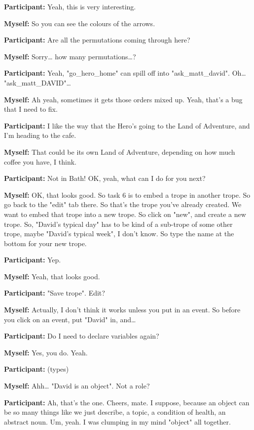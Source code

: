 \documentclass[11pt]{report}
\begin{document}
\begin{linenumbers}
\textbf{Participant:} Yeah, this is very interesting.

\textbf{Myself:} So you can see the colours of the arrows.

\textbf{Participant:} Are all the permutations coming through here?

\textbf{Myself:} Sorry\ldots{} how many permutations\ldots{}?

\textbf{Participant:} Yeah, "go_hero_home" can spill off into "ask_matt_david". Oh\ldots{} "ask_matt_DAVID"\ldots{}

\textbf{Myself:} Ah yeah, sometimes it gets those orders mixed up. Yeah, that's a bug that I need to fix.

\textbf{Participant:} I like the way that the Hero's going to the Land of Adventure, and I'm heading to the cafe.

\textbf{Myself:} That could be its own Land of Adventure, depending on how much coffee you have, I think.

\textbf{Participant:} Not in Bath! OK, yeah, what can I do for you next?

\textbf{Myself:} OK, that looks good. So task 6 is to embed a trope in another trope. So go back to the "edit" tab there. So that's the trope you've already created. We want to embed that trope into a new trope. So click on "new", and create a new trope. So, "David's typical day" has to be kind of a sub-trope of some other trope, maybe "David's typical week", I don't know. So type the name at the bottom for your new trope.

\textbf{Participant:} Yep.

\textbf{Myself:} Yeah, that looks good.

\textbf{Participant:} "Save trope". Edit?

\textbf{Myself:} Actually, I don't think it works unless you put in an event. So before you click on an event, put "David" in, and\ldots{}

\textbf{Participant:} Do I need to declare variables again?

\textbf{Myself:} Yes, you do. Yeah.

\textbf{Participant:} (types)

\textbf{Myself:} Ahh\ldots{} "David is an object". Not a role?

\textbf{Participant:} Ah, that's the one. Cheers, mate. I suppose, because an object can be so many things like we just describe, a topic, a condition of health, an abstract noun. Um, yeah. I was clumping in my mind "object" all together.


\end{linenumbers}
\end{document}
